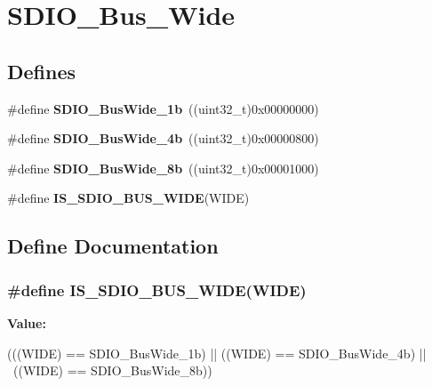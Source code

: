 \hypertarget{group__SDIO__Bus__Wide}{
\section{SDIO\_\-Bus\_\-Wide}
\label{group__SDIO__Bus__Wide}
}
\subsection*{Defines}
\begin{DoxyCompactItemize}
\item 
\hypertarget{group__SDIO__Bus__Wide_ga9c333b57937c5cc0a173a58519f9250a}{
\#define {\bfseries SDIO\_\-BusWide\_\-1b}~((uint32\_\-t)0x00000000)}
\label{group__SDIO__Bus__Wide_ga9c333b57937c5cc0a173a58519f9250a}

\item 
\hypertarget{group__SDIO__Bus__Wide_ga79815d1d798b28a2d3750ad25466ff1b}{
\#define {\bfseries SDIO\_\-BusWide\_\-4b}~((uint32\_\-t)0x00000800)}
\label{group__SDIO__Bus__Wide_ga79815d1d798b28a2d3750ad25466ff1b}

\item 
\hypertarget{group__SDIO__Bus__Wide_ga4d864f5c4e1af298146afc1d680081e9}{
\#define {\bfseries SDIO\_\-BusWide\_\-8b}~((uint32\_\-t)0x00001000)}
\label{group__SDIO__Bus__Wide_ga4d864f5c4e1af298146afc1d680081e9}

\item 
\#define {\bfseries IS\_\-SDIO\_\-BUS\_\-WIDE}(WIDE)
\end{DoxyCompactItemize}


\subsection{Define Documentation}
\hypertarget{group__SDIO__Bus__Wide_gaa5c6ad922117d5df3213631bf68fde5b}{
\subsubsection[{IS\_\-SDIO\_\-BUS\_\-WIDE}]{\setlength{\rightskip}{0pt plus 5cm}\#define IS\_\-SDIO\_\-BUS\_\-WIDE(WIDE)}}
\label{group__SDIO__Bus__Wide_gaa5c6ad922117d5df3213631bf68fde5b}
{\bfseries Value:}
\begin{DoxyCode}
(((WIDE) == SDIO_BusWide_1b) || ((WIDE) == SDIO_BusWide_4b) || \
                                ((WIDE) == SDIO_BusWide_8b))
\end{DoxyCode}
